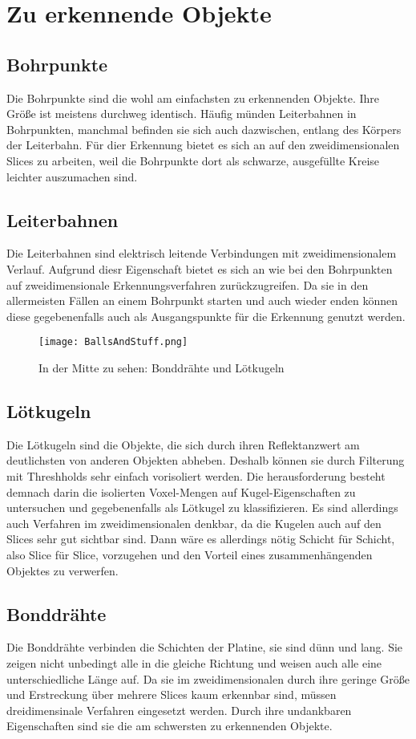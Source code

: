 \section{Zu erkennende Objekte}

\subsection{Bohrpunkte}
Die Bohrpunkte sind die wohl am einfachsten zu erkennenden Objekte. Ihre Größe ist meistens durchweg identisch. Häufig münden Leiterbahnen in Bohrpunkten, manchmal befinden sie sich auch dazwischen, entlang des Körpers der Leiterbahn. Für dier Erkennung bietet es sich an auf den zweidimensionalen Slices zu arbeiten, weil die Bohrpunkte dort als schwarze, ausgefüllte Kreise leichter auszumachen sind.

\subsection{Leiterbahnen}
Die Leiterbahnen sind elektrisch leitende Verbindungen mit zweidimensionalem Verlauf. Aufgrund diesr Eigenschaft bietet es sich an wie bei den Bohrpunkten auf zweidimensionale Erkennungsverfahren zurückzugreifen. Da sie in den allermeisten Fällen an einem Bohrpunkt starten und auch wieder enden können diese gegebenenfalls auch als Ausgangspunkte für die Erkennung genutzt werden.

\begin{figure}[H]
  \begin{center}
    \texttt{[image: BallsAndStuff.png]}
    \caption{In der Mitte zu sehen: Bonddrähte und Lötkugeln}
    \label{fig:BallsAndBonds}
  \end{center}
\end{figure}

\subsection{Lötkugeln}
Die Lötkugeln sind die Objekte, die sich durch ihren Reflektanzwert am deutlichsten von anderen Objekten abheben. Deshalb können sie durch Filterung mit Threshholds sehr einfach vorisoliert werden. Die herausforderung besteht demnach darin die isolierten Voxel-Mengen auf Kugel-Eigenschaften zu untersuchen und gegebenenfalls als Lötkugel zu klassifizieren. Es sind allerdings auch Verfahren im zweidimensionalen denkbar, da die Kugelen auch auf den Slices sehr gut sichtbar sind. Dann wäre es allerdings nötig Schicht für Schicht, also Slice für Slice, vorzugehen und den Vorteil eines zusammenhängenden Objektes zu verwerfen.

\subsection{Bonddrähte}
Die Bonddrähte verbinden die Schichten der Platine, sie sind dünn und lang. Sie zeigen nicht unbedingt alle in die gleiche Richtung und weisen auch alle eine unterschiedliche Länge auf. Da sie im zweidimensionalen durch ihre geringe Größe und Erstreckung über mehrere Slices kaum erkennbar sind, müssen dreidimensinale Verfahren eingesetzt werden. Durch ihre undankbaren Eigenschaften sind sie die am schwersten zu erkennenden Objekte.